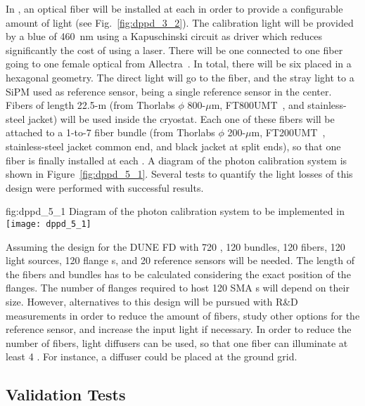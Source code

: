 In , an optical fiber will be installed at each  in order to provide a configurable amount of light (see Fig.~\ref{fig:dppd_3_2}). The calibration light will be provided by a blue   of \SI{460}{nm} using a Kapuschinski circuit as   driver which reduces significantly the cost of using a laser. There will be one   connected to one fiber going to one female optical \fdth from Allectra~\cite{allectra}. In total,  there will be six   placed in a hexagonal geometry. The direct light will go to the fiber, and the stray light to a SiPM used as reference sensor, being a single reference sensor in the center. Fibers of length 22.5-m (from Thorlabs $\phi$ 800-$\mu$m, FT800UMT~\cite{ft800umt}, and stainless-steel jacket) will be used inside the cryostat. Each one of these fibers will be attached to a 1-to-7 fiber bundle (from Thorlabs $\phi$ 200-$\mu$m, FT200UMT~\cite{ft200umt}, stainless-steel jacket common end, and black jacket at split ends), so that one fiber is finally installed at each . A diagram of the  photon calibration system is shown in Figure~\ref{fig:dppd_5_1}. Several tests to quantify the light losses of this design were performed with successful results. 

\begin{dunefigure}{fig:dppd_5_1}
{Diagram of the photon calibration system to be implemented in }
\texttt{[image: dppd\_5\_1]}
\end{dunefigure}

Assuming the  design for the DUNE FD with \num{720} , \num{120} bundles, \num{120} fibers, \num{120} light sources, \num{120} flange \fdth{}s, and \num{20} reference sensors will be needed. The length of the fibers and bundles has to be calculated considering the exact position of the \fdth flanges. The number of flanges required to host \num{120} SMA \fdth{}s will depend on their size. However, alternatives to this design will be pursued with R\&D measurements in order to reduce the amount of fibers, study other options for the reference sensor, and increase the input light if necessary. In order to reduce the number of fibers, light diffusers can be used, so that one fiber can illuminate at least \num{4} . For instance, a diffuser could be placed at the ground grid. 

\subsection{Validation Tests}
\label{sec:fddp-pd-5.2}

